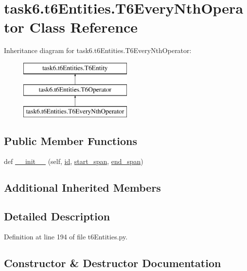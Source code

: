 \hypertarget{classtask6_1_1t6Entities_1_1T6EveryNthOperator}{}\section{task6.\+t6\+Entities.\+T6\+Every\+Nth\+Operator Class Reference}
\label{classtask6_1_1t6Entities_1_1T6EveryNthOperator}
Inheritance diagram for task6.\+t6\+Entities.\+T6\+Every\+Nth\+Operator\+:\begin{figure}[H]
\begin{center}
\leavevmode
\includegraphics[height=3.000000cm]{classtask6_1_1t6Entities_1_1T6EveryNthOperator}
\end{center}
\end{figure}
\subsection*{Public Member Functions}
\begin{DoxyCompactItemize}
\item 
def \hyperlink{classtask6_1_1t6Entities_1_1T6EveryNthOperator_a0a776eb2a3e12e280405a629eb0fc2e4}{\+\_\+\+\_\+init\+\_\+\+\_\+} (self, \hyperlink{classtask6_1_1t6Entities_1_1T6Entity_afeeced8134bb3ebe0cfecc64d0ab46a4}{id}, \hyperlink{classtask6_1_1t6Entities_1_1T6Entity_a52779e9af8864dc98e8b02fc5b9b041a}{start\+\_\+span}, \hyperlink{classtask6_1_1t6Entities_1_1T6Entity_aeb402200b156cd9562c5111dfe777b98}{end\+\_\+span})
\end{DoxyCompactItemize}
\subsection*{Additional Inherited Members}


\subsection{Detailed Description}


Definition at line 194 of file t6\+Entities.\+py.



\subsection{Constructor \& Destructor Documentation}
\mbox{\label{classtask6_1_1t6Entities_1_1T6EveryNthOperator_a0a776eb2a3e12e280405a629eb0fc2e4}} 
